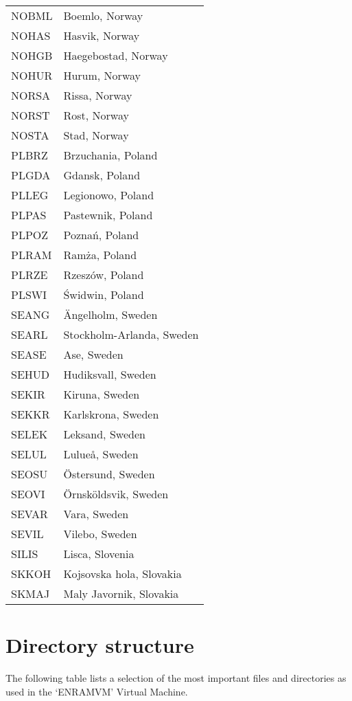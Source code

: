 \begin{longtable}[htb]{ll}
NOBML & Boemlo, Norway \\
NOHAS & Hasvik, Norway \\
NOHGB & Haegebostad, Norway \\
NOHUR & Hurum, Norway \\
NORSA & Rissa, Norway \\
NORST & Rost, Norway \\
NOSTA & Stad, Norway \\
PLBRZ & Brzuchania, Poland \\
PLGDA & Gdansk, Poland \\
PLLEG & Legionowo, Poland \\
PLPAS & Pastewnik, Poland \\
PLPOZ & Pozna\'{n}, Poland \\
PLRAM & Ram\.{z}a, Poland \\
PLRZE & Rzesz\'{o}w, Poland \\
PLSWI & \'{S}widwin, Poland \\
SEANG & \"{A}ngelholm, Sweden \\
SEARL & Stockholm-Arlanda, Sweden \\
SEASE & Ase, Sweden \\
SEHUD & Hudiksvall, Sweden \\
SEKIR & Kiruna, Sweden \\
SEKKR & Karlskrona, Sweden \\
SELEK & Leksand, Sweden \\
SELUL & Lulue\r{a}, Sweden \\
SEOSU & \"{O}stersund, Sweden \\
SEOVI & \"{O}rnsk\"{o}ldsvik, Sweden \\
SEVAR & Vara, Sweden \\
SEVIL & Vilebo, Sweden \\
SILIS & Lisca, Slovenia \\
SKKOH & Kojsovska hola, Slovakia \\
SKMAJ & Maly Javornik, Slovakia\\
\end{longtable}

\needspace{10em}
\section{Directory structure}
The following table lists a selection of the most important files and directories as used in the \mbox{`ENRAMVM'} Virtual Machine.

